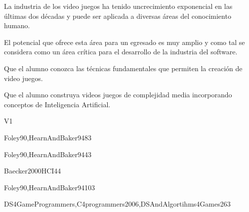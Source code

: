 \begin{syllabus}


\begin{justification}
La industria de los video juegos ha tenido uncrecimiento exponencial en las últimas dos décadas y puede ser aplicada a 
diversas áreas del conocimiento humano.

El potencial que ofrece esta área para un egresado es muy amplio y como tal se considera como un área crítica para el 
desarrollo de la industria del software.
\end{justification}

\begin{goals}
\item Que el alumno conozca las técnicas fundamentales que permiten la creación de video juegos.
\item Que el alumno construya videos juegos de complejidad media incorporando conceptos de Inteligencia Artificial.
\end{goals}

\begin{outcomes}{V1}
\end{outcomes}

\begin{unit}{\GVAdvancedTechniquesDef}{Foley90,HearnAndBaker94}{8}{3}
        \GVAdvancedTechniquesAllTopics
        \GVAdvancedTechniquesAllObjectives
\end{unit}

\begin{unit}{\GVVisualizationDef}{Foley90,HearnAndBaker94}{4}{3}
        \GVVisualizationAllTopics
        \GVVisualizationAllObjectives
\end{unit}

\begin{unit}{\HCFoundationsDef}{Baecker2000HCI}{4}{4}
    \HCFoundationsAllTopics
    \HCFoundationsAllObjectives
\end{unit}

\begin{unit}{\GVAdvancedRenderingDef}{Foley90,HearnAndBaker94}{10}{3}
        \GVAdvancedRenderingAllTopics
        \GVAdvancedRenderingAllObjectives
\end{unit}

\begin{unit}{\GVGameEngineProgrammingDef}{DS4GameProgrammers,C4programmers2006,DSAndAlgortihms4Games}{26}{3}
    \GVGameEngineProgrammingAllTopics
    \GVGameEngineProgrammingAllObjectives
\end{unit}

\begin{coursebibliography}
\end{coursebibliography}

\end{syllabus}

